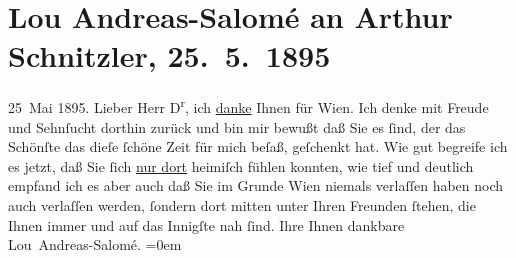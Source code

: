 

         \renewcommand{\erwaehnteOrte}{Orte: Paris, Wien}
         \renewcommand{\erwaehnteWerke}{}
               \section[Lou Andreas-Salomé an Arthur Schnitzler, 25. 5. 1895]{ Lou Andreas-Salomé an Arthur Schnitzler, 25. 5. 1895}\nopagebreak{}\rehead{ }\begin{ledgroupsized}[t]{13cm}\normalsize\beginnumbering \toendnotes[C]{\smallbreak\pagebreak[2]} 
\pstart
           {\pb}25 Mai 1895.\pend
           \pstart{}Lieber Herr D\textsuperscript{r},\pend\pstart
           ich \uline{danke} Ihnen für Wien. Ich denke mit Freude und Sehnſucht dorthin zurück und bin mir bewußt
               daß Sie es ſind, der das Schönſte das dieſe ſchöne Zeit für mich beſaß, geſchenkt
               hat. Wie gut begreife ich es jetzt, daß Sie ſich \uline{nur
                  dort} heimiſch fühlen konnten, wie tief und deutlich empfand ich es aber auch
               daß Sie im Grunde Wien niemals verlaſſen haben
               noch auch verlaſſen werden, ſondern dort mitten {\pb}unter Ihren Freunden ſtehen, die Ihnen immer und auf das Innigſte nah ſind.\pend
           \pstart
           Ihre Ihnen dankbare{\\[\baselineskip]}\spacefill\mbox{Lou Andreas-Salomé.}\pend
           \leftskip=0em{}
         
         \endnumbering{}\end{ledgroupsized}  \newcommand{\dateiname}{L00445}\newcommand{\titel}{Lou Andreas-Salomé an Arthur Schnitzler, 25. 5. 1895}\newcommand{\editorInnen}{Martin Anton Müller und Gerd-Hermann Susen}
      